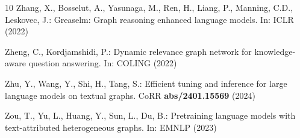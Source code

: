 \documentclass[runningheads]{llncs}
\begin{document}
\begin{thebibliography}{10}
Zhang, X., Bosselut, A., Yasunaga, M., Ren, H., Liang, P., Manning, C.D.,
  Leskovec, J.: Greaselm: Graph reasoning enhanced language models. In: ICLR
  (2022)

Zheng, C., Kordjamshidi, P.: Dynamic relevance graph network for
  knowledge-aware question answering. In: COLING (2022)

Zhu, Y., Wang, Y., Shi, H., Tang, S.: Efficient tuning and inference for large
  language models on textual graphs. CoRR  \textbf{abs/2401.15569} (2024)

Zou, T., Yu, L., Huang, Y., Sun, L., Du, B.: Pretraining language models with
  text-attributed heterogeneous graphs. In: EMNLP (2023)

\end{thebibliography}
\end{document}

